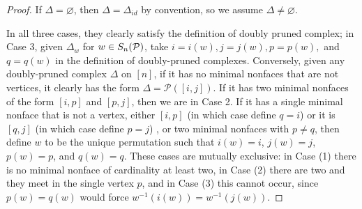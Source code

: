 \begin{proof}
    If $\Delta = \varnothing$, then $\Delta = \Delta_{id}$ by convention, so we assume $\Delta\neq \varnothing$.
    
    In all three cases, they clearly satisfy the definition of doubly pruned complex; in Case 3, given $\Delta_w$ for $w\in S_n(\mathcal{P})$, take $i = i(w), j = j(w), p = p(w),$ and $q = q(w)$ in the definition of doubly-pruned complexes.
    Conversely, given any doubly-pruned complex $\Delta$ on $[n]$, if it has no minimal nonfaces that are not vertices, it clearly has the form $\Delta=\mathscr{P}([i,j])$.
    If it has two minimal nonfaces of the form $[i,p]$ and $[p,j]$, then we are in Case 2.
    If it has a single minimal nonface that is not a vertex, either $[i,p]$ (in which case define $q=i$) or it is $[q,j]$ (in which case define $p=j$) , or two minimal nonfaces with $p\neq q$, then define $w$ to be the unique permutation such that $i(w)=i$, $j(w)=j$, $p(w)=p$, and $q(w)=q$.
    These cases are mutually exclusive: in Case (1) there is no minimal nonface of cardinality at least two, in Case (2) there are two and they meet in the single vertex $p$, and in Case (3) this cannot occur, since $p(w) = q(w)$ would force $w^{-1}(i(w)) = w^{-1}(j(w))$.
\end{proof}


